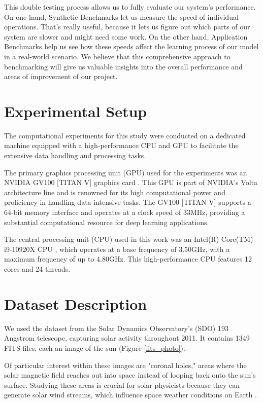 \documentclass[licencjacka,en]{pracamgr}
\begin{document}
This double testing process allows us to fully evaluate our system's performance. On one hand, Synthetic Benchmarks let us measure the speed of individual operations. That's really useful, because it lets us figure out which parts of our system are slower and might need some work. On the other hand, Application Benchmarks help us see how these speeds affect the learning process of our model in a real-world scenario. We believe that this comprehensive approach to benchmarking will give us valuable insights into the overall performance and areas of improvement of our project.

\section{Experimental Setup}

The computational experiments for this study were conducted on a dedicated machine equipped with a high-performance CPU and GPU to facilitate the extensive data handling and processing tasks.

The primary graphics processing unit (GPU) used for the experiments was an NVIDIA GV100 [TITAN V] graphics card \cite{titan}. This GPU is part of NVIDIA's Volta architecture line and is renowned for its high computational power and proficiency in handling data-intensive tasks. The GV100 [TITAN V] supports a 64-bit memory interface and operates at a clock speed of 33MHz, providing a substantial computational resource for deep learning applications.

The central processing unit (CPU) used in this work was an Intel(R) Core(TM) i9-10920X CPU \cite{intel}, which operates at a base frequency of 3.50GHz, with a maximum frequency of up to 4.80GHz. This high-performance CPU features 12 cores and 24 threads.


\section{\label{dataset}Dataset Description}

We used the dataset from the Solar Dynamics Observatory's (SDO) 193 Angstrom telescope, capturing solar activity throughout 2011. It contains 1349 FITS files, each an image of the sun (Figure \ref{fits_photo}).

Of particular interest within these images are "coronal holes," areas where the solar magnetic field reaches out into space instead of looping back onto the sun's surface. Studying these areas is crucial for solar physicists because they can generate solar wind streams, which influence space weather conditions on Earth \cite{coronal-holes}.
\end{document}
